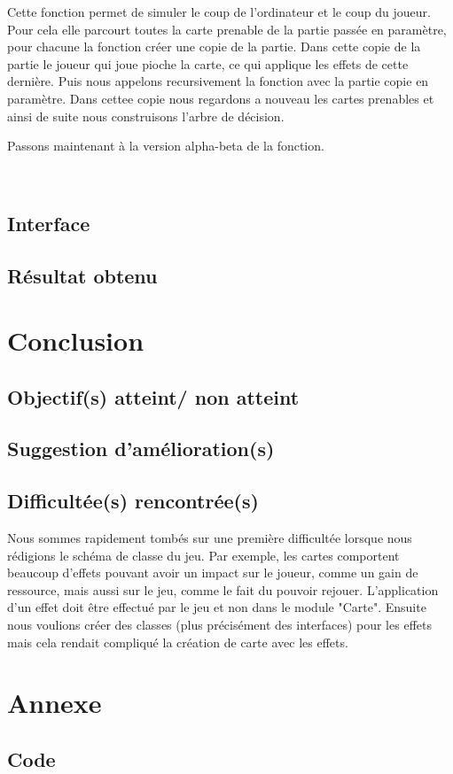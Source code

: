 \documentclass[a4paper, 12pt, french]{article}
\begin{document}
		Cette fonction permet de simuler le coup de l'ordinateur et le coup du joueur.
		Pour cela elle parcourt toutes la carte prenable de la partie passée en paramètre,
		pour chacune la fonction créer une copie de la partie. Dans cette copie
		de la partie le joueur qui joue pioche la carte, ce qui applique les effets 
		de cette dernière. Puis nous appelons recursivement la fonction avec la partie
		copie en paramètre. Dans cettee copie nous regardons a nouveau les cartes prenables
		et ainsi de suite nous construisons l'arbre de décision.

		Passons maintenant à la version alpha-beta de la fonction.
		\begin{lstlisting}
			
		\end{lstlisting}

	\subsection{Interface}
	\subsection{Résultat obtenu}

	\section{Conclusion}
	\subsection{Objectif(s) atteint/ non atteint}
	\subsection{Suggestion d'amélioration(s)}
	\subsection{Difficultée(s) rencontrée(s)}
	Nous sommes rapidement tombés sur une première difficultée lorsque nous rédigions le schéma de classe du jeu.
	Par exemple, les cartes comportent beaucoup d'effets pouvant avoir un impact sur le joueur,
	comme un gain de ressource, mais aussi sur le jeu, comme le fait du pouvoir rejouer. L'application d'un effet
	doit être effectué par le jeu et non dans le module "Carte". Ensuite nous voulions créer des classes (plus
	précisément des interfaces) pour les effets mais cela rendait compliqué la création de carte avec les effets.

	\section{Annexe}
	\subsection{Code}

	\printbibliography
\end{document}
